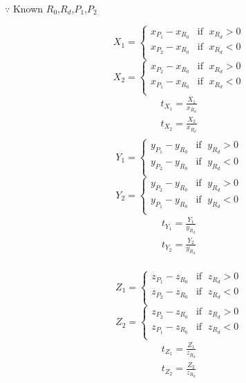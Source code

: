 $\because$ Known $R_0$,\enspace$R_d$,\enspace$P_1$,\enspace$P_2$
\begin{multicols}{2}
\noindent
\[
X_1 =
\begin{cases}
x_{P_1} - x_{R_0} & \text{if }\;x_{R_d} > 0\\
x_{P_2} - x_{R_0} & \text{if }\;x_{R_d} < 0\\
\end{cases}
\]
\[
X_2 =
\begin{cases}
x_{P_2} - x_{R_0} & \text{if }\;x_{R_d} > 0\\
x_{P_1} - x_{R_0} & \text{if }\;x_{R_d} < 0\\
\end{cases}
\]
\[
\begin{array}{lr}
t_{X_1} = \frac{X_1}{x_{R_d}}\\
t_{X_2} = \frac{X_2}{x_{R_d}}\\
\end{array}
\]
\columnbreak
\[
Y_1 =
\begin{cases}
y_{P_1} - y_{R_0} & \text{if }\;y_{R_d} > 0\\
y_{P_2} - y_{R_0} & \text{if }\;y_{R_d} < 0\\
\end{cases}
\]
\[
Y_2 =
\begin{cases}
y_{P_2} - y_{R_0} & \text{if }\;y_{R_d} > 0\\
y_{P_1} - y_{R_0} & \text{if }\;y_{R_d} < 0\\
\end{cases}
\]
\[
\begin{array}{lr}
t_{Y_1} = \frac{Y_1}{y_{R_d}}\\
t_{Y_2} = \frac{Y_2}{y_{R_d}}\\
\end{array}
\]
\end{multicols}
\begin{multicols}{2}
\noindent
\[
Z_1 =
\begin{cases}
z_{P_1} - z_{R_0} & \text{if }\;z_{R_d} > 0\\
z_{P_2} - z_{R_0} & \text{if }\;z_{R_d} < 0\\
\end{cases}
\]
\[
Z_2 =
\begin{cases}
z_{P_2} - z_{R_0} & \text{if }\;z_{R_d} > 0\\
z_{P_1} - z_{R_0} & \text{if }\;z_{R_d} < 0\\
\end{cases}
\]
\[
\begin{array}{lr}
t_{Z_1} = \frac{Z_1}{z_{R_d}}\\
t_{Z_2} = \frac{Z_2}{z_{R_d}}\\
\end{array}
\]
\columnbreak
\[
\]
\end{multicols}


